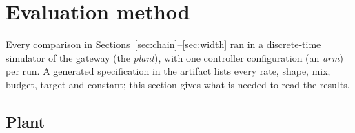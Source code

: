 \section{Evaluation method}
\label{sec:method}

Every comparison in Sections~\ref{sec:chain}--\ref{sec:width} ran in a
discrete-time simulator of the gateway (the \emph{plant}), with one
controller configuration (an \emph{arm}) per run. A generated
specification in the artifact lists every rate, shape, mix, budget,
target and constant; this section gives what is needed to read the
results.

\subsection{Plant}
\label{sec:plant}

\begin{table}[t]
\caption{Model tiers of the plant: price per cache miss, base latency per
AI request kind, and answer quality (mean of 11 benchmark scores of the
Qwen2.5 instruction-tuned models~\cite{qwen25}, divided by 100; priced only
in the QUALITY campaign). The prices form a synthetic 1:10:100 ladder;
our own GPU bench measured 1:1.475:1.518 for the three models.}
\label{tab:tiers}
\centering\tablefont

\end{table}

